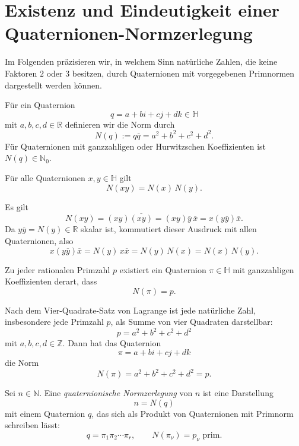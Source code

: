 \section{Existenz und Eindeutigkeit einer Quaternionen-Normzerlegung}

Im Folgenden präzisieren wir, in welchem Sinn natürliche Zahlen, die keine Faktoren $2$ oder $3$ besitzen, durch Quaternionen mit vorgegebenen Primnormen dargestellt werden können.

\begin{definition}[Quaternionennorm]
	Für ein Quaternion
	\[
	q=a+bi+cj+dk \in \mathbb H
	\]
	mit $a,b,c,d\in\mathbb R$ definieren wir die Norm durch
	\[
	N(q):=q\overline q=a^2+b^2+c^2+d^2.
	\]
	Für Quaternionen mit ganzzahligen oder Hurwitzschen Koeffizienten ist $N(q)\in\mathbb N_0$.
\end{definition}

\begin{lemma}
	Für alle Quaternionen $x,y\in\mathbb H$ gilt
	\[
	N(xy)=N(x)\,N(y).
	\]
\end{lemma}

\begin{beweis}
	Es gilt
	\[
	N(xy)=(xy)\overline{(xy)}=(xy)\overline y\,\overline x=x(y\overline y)\overline x.
	\]
	Da $y\overline y=N(y)\in\mathbb R$ skalar ist, kommutiert dieser Ausdruck mit allen Quaternionen, also
	\[
	x(y\overline y)\overline x = N(y)\,x\overline x=N(y)\,N(x)=N(x)\,N(y).
	\]
\end{beweis}

\begin{lemma}
	Zu jeder rationalen Primzahl $p$ existiert ein Quaternion $\pi\in\mathbb H$ mit ganzzahligen Koeffizienten derart, dass
	\[
	N(\pi)=p.
	\]
\end{lemma}

\begin{beweis}
	Nach dem Vier-Quadrate-Satz von Lagrange ist jede natürliche Zahl, insbesondere jede Primzahl $p$, als Summe von vier Quadraten darstellbar:
	\[
	p=a^2+b^2+c^2+d^2
	\]
	mit $a,b,c,d\in\mathbb Z$.
	Dann hat das Quaternion
	\[
	\pi=a+bi+cj+dk
	\]
	die Norm
	\[
	N(\pi)=a^2+b^2+c^2+d^2=p.
	\]
\end{beweis}

\begin{definition}
	Sei $n\in\mathbb N$. Eine \emph{quaternionische Normzerlegung} von $n$ ist eine Darstellung
	\[
	n=N(q)
	\]
	mit einem Quaternion $q$, das sich als Produkt von Quaternionen mit Primnorm schreiben lässt:
	\[
	q=\pi_1\pi_2\cdots \pi_r,
	\qquad N(\pi_\nu)=p_\nu \text{ prim}.
	\]
\end{definition}

